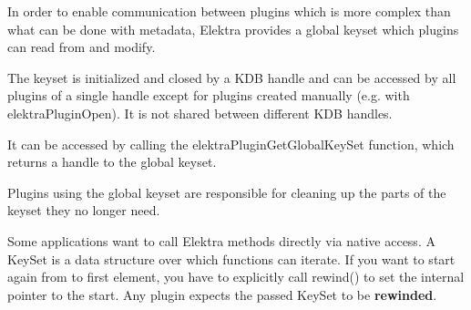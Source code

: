 In order to enable communication between plugins which is more complex than what can be done with metadata, Elektra provides a global keyset which plugins can read from and modify.

The keyset is initialized and closed by a K\+DB handle and can be accessed by all plugins of a single handle except for plugins created manually (e.\+g. with {\ttfamily elektra\+Plugin\+Open}). It is not shared between different K\+DB handles.

It can be accessed by calling the {\ttfamily elektra\+Plugin\+Get\+Global\+Key\+Set} function, which returns a handle to the global keyset.

Plugins using the global keyset are responsible for cleaning up the parts of the keyset they no longer need.

Some applications want to call Elektra methods directly via native access. A {\ttfamily Key\+Set} is a data structure over which functions can iterate. If you want to start again from to first element, you have to explicitly call {\ttfamily rewind()} to set the internal pointer to the start. Any plugin expects the passed {\ttfamily Key\+Set} to be {\bfseries rewinded}. 